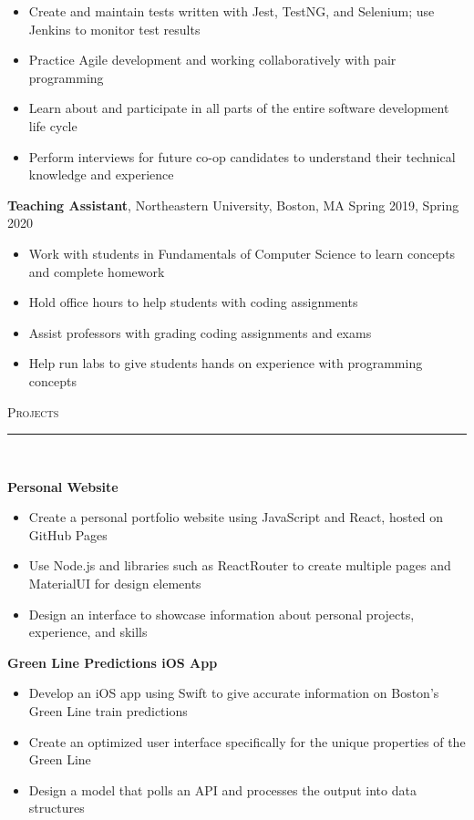 \documentclass[11pt]{article}
\begin{document}
\begin{raggedright}
\begin{itemize}
		\item Create and maintain tests written with Jest, TestNG, and Selenium; use Jenkins to monitor test results
		\item Practice Agile development and working collaboratively with pair programming
		\item Learn about and participate in all parts of the entire software development life cycle
		\item Perform interviews for future co-op candidates to understand their technical knowledge and experience
		\end{itemize}
	\vspace{0.1in}

	\textbf{\large Teaching Assistant}, Northeastern University, Boston, MA 
	\hfill Spring 2019, Spring 2020 \\
	\begin{itemize}
		\item Work with students in Fundamentals of Computer Science to learn concepts and complete homework
		\item Hold office hours to help students with coding assignments
		\item Assist professors with grading coding assignments and exams
		\item Help run labs to give students hands on experience with programming concepts
	\end{itemize}
	\vspace{0.1in}
	
	\textsc{\Large Projects} \\
	\vspace{-0.1in}
	\rule{\textwidth}{0.4pt} \\
	\vspace{0.05in}
	
	\textbf{\large Personal Website} 
	\begin{itemize}
		\item Create a personal portfolio website using JavaScript and React, hosted on GitHub Pages
		\item Use Node.js and libraries such as ReactRouter to create multiple pages and MaterialUI for design elements
		\item Design an interface to showcase information about personal projects, experience, and skills
	\end{itemize}
	\vspace{0.1in}
	
	\textbf{\large Green Line Predictions iOS App} 
	\begin{itemize}
		\item Develop an iOS app using Swift to give accurate information on Boston's Green Line train predictions
		\item Create an optimized user interface specifically for the unique properties of the Green Line
		\item Design a model that polls an API and processes the output into data structures
	\end{itemize}
	\vspace{0.1in}
	

\end{raggedright}
\end{document}
